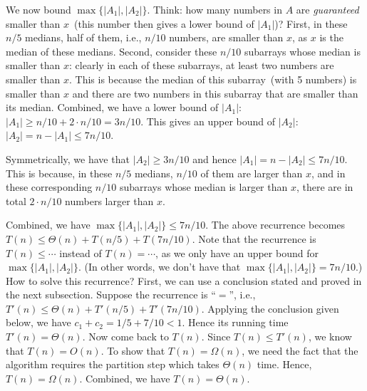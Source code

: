 We now bound $\max\{|A_1|, |A_2|\}$.
Think: how many numbers in $A$ are \emph{guaranteed} smaller than $x$~(this number then gives a lower bound of $|A_1|$)?
First, in these $n/5$ medians, half of them, i.e., $n/10$ numbers, are smaller than $x$, as $x$ is the median of these medians.
Second, consider these $n/10$ subarrays whose median is smaller than $x$: clearly in each of these subarrays, at least
two numbers are smaller than $x$. This is because the median of this subarray~(with 5 numbers) is smaller than $x$ and there are two numbers
in this subarray that are smaller than its median. Combined, we have a lower bound of $|A_1|$: $|A_1| \ge n/10 + 2 \cdot n/10 = 3n/10$.
This gives an upper bound of $|A_2|$: $|A_2| = n - |A_1| \le 7n/10$.

Symmetrically, we have that $|A_2| \ge 3n/10$ and hence $|A_1| = n - |A_2| \le 7n/10$.
This is because, in these $n/5$ medians, $n/10$ of them are larger than $x$,
and in these corresponding $n/10$ subarrays whose median is larger than $x$, there are in total $2\cdot n/10$ numbers larger than $x$.

Combined, we have $\max\{|A_1|, |A_2|\} \le 7n/10$.  The above recurrence becomes $T(n) \le \Theta(n) + T(n/5) + T(7n/10)$.
Note that the recurrence is $T(n) \le \cdots$ instead of $T(n) = \cdots$, as we only have an upper bound for $\max\{|A_1|, |A_2|\}$.
(In other words, we don't have that $\max\{|A_1|, |A_2|\} = 7n/10$.)
How to solve this recurrence? %
First, we can use a conclusion stated and proved in the next subsection. %
Suppose the recurrence is ``$=$'', i.e., $T'(n) \le \Theta(n) + T'(n/5) + T'(7n/10)$.
Applying the conclusion given below, we have $c_1 + c_2 = 1/5 + 7/10 < 1$. Hence its running time $T'(n) = \Theta(n)$.
Now come back to $T(n)$. Since $T(n) \le T'(n)$, we know that $T(n) = O(n)$.
To show that $T(n) = \Omega(n)$, we need the fact that the algorithm requires
the partition step which takes $\Theta(n)$ time. Hence, $T(n) = \Omega(n)$.
Combined, we have $T(n) = \Theta(n)$.


